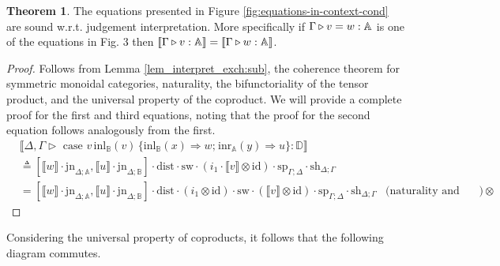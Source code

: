 \documentclass[10pt,a4paper]{amsart}
\theoremstyle{definition}
\theoremstyle{definition}
\theoremstyle{definition}
\theoremstyle{definition}
\theoremstyle{definition}
\theoremstyle{definition}
\newtheorem{theorem}[definition]{Theorem}
\begin{document}
\begin{theorem} \label {theorem:eq_in_context}
  The equations presented in Figure \ref{fig:equations-in-context-cond} are sound w.r.t. judgement interpretation. More specifically if $ \Gamma \triangleright v = w: \mathbb{A}$ is one of the equations in Fig. 3 then $[\![ \Gamma \triangleright v: \mathbb{A} ]\!] = [\![ \Gamma \triangleright w: \mathbb{A} ]\!]$.
\end{theorem}

\begin{proof}
  Follows from Lemma \autoref{lem_interpret_exch:sub}, the coherence theorem for symmetric monoidal categories, naturality,  the bifunctoriality of the tensor product, and the universal property of the coproduct.   
  We will provide a complete proof for the first and third equations, noting that the proof for the second equation follows analogously from the first.
  \begin{align*}
    &\llbracket \Delta,\Gamma \triangleright  \text{ case } v \hspace{2pt} \text{inl}_{\mathbb{B}}(v) \hspace{2pt} \{\text{inl}_{\mathbb{B}} (x) \Rightarrow w ; \hspace{1pt} \text{inr}_{\mathbb{A}} (y) \Rightarrow u\}: \mathbb{D}\rrbracket \\
    & \triangleq  [\llbracket w\rrbracket \cdot \text{jn}_{\Delta;\mathbb{A}},\llbracket u \rrbracket\cdot \text{jn}_{\Delta;\mathbb{B}}] \cdot \text{dist} \cdot \text{sw} \cdot ( i_1 \cdot \llbracket  v \rrbracket \otimes \text{id}) \cdot \text{sp}_{\Gamma;\Delta} \cdot \text{sh}_{\Delta;\Gamma} \\
    & = [\llbracket w\rrbracket \cdot \text{jn}_{\Delta;\mathbb{A}},\llbracket u \rrbracket\cdot \text{jn}_{\Delta;\mathbb{B}}] \cdot \text{dist} \cdot (i_1 \otimes \text{id}) \cdot \text{sw} \cdot ( \llbracket  v \rrbracket \otimes \text{id}) \cdot \text{sp}_{\Gamma;\Delta} \cdot \text{sh}_{\Delta;\Gamma} &{(\text{naturality and bifunctoriality  of } \otimes}) 
  \end{align*}
\end{proof}

Considering the universal property of coproducts, it follows that the following diagram commutes.

\end{document}
